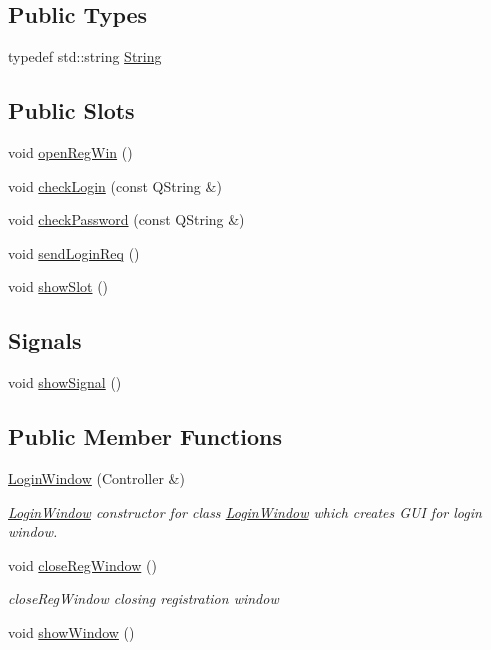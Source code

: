 \subsection*{Public Types}
\begin{DoxyCompactItemize}
\item 
typedef std\+::string \hyperlink{classLoginWindow_a9d5191a38906ea9c5375c1029cfd9d4d}{String}
\end{DoxyCompactItemize}
\subsection*{Public Slots}
\begin{DoxyCompactItemize}
\item 
void \hyperlink{classLoginWindow_abe06ec97d678045c810e2ac6033ee9c0}{open\+Reg\+Win} ()
\item 
void \hyperlink{classLoginWindow_a01edb22f1bf6dfdf3bd0811f6c878330}{check\+Login} (const Q\+String \&)
\item 
void \hyperlink{classLoginWindow_ad5a16b9244af77d36f98a4f48d3d423d}{check\+Password} (const Q\+String \&)
\item 
void \hyperlink{classLoginWindow_ac6dc94a63017e4e500b7ec0cbd4cac33}{send\+Login\+Req} ()
\item 
void \hyperlink{classLoginWindow_a8e8dfb5d47f4771d469be1d764aa8509}{show\+Slot} ()
\end{DoxyCompactItemize}
\subsection*{Signals}
\begin{DoxyCompactItemize}
\item 
void \hyperlink{classLoginWindow_a27cf306a0fd680afd528c016f2df8926}{show\+Signal} ()
\end{DoxyCompactItemize}
\subsection*{Public Member Functions}
\begin{DoxyCompactItemize}
\item 
\hyperlink{classLoginWindow_ad3f4ec97bdb1fd55e3e6f6f25112f9d8}{Login\+Window} (Controller \&)
\begin{DoxyCompactList}\small\item\em \hyperlink{classLoginWindow}{Login\+Window} constructor for class \hyperlink{classLoginWindow}{Login\+Window} which creates G\+UI for login window. \end{DoxyCompactList}\item 
void \hyperlink{classLoginWindow_a1d429ebfb0f2ebb21591b209da5d4ecb}{close\+Reg\+Window} ()
\begin{DoxyCompactList}\small\item\em close\+Reg\+Window closing registration window \end{DoxyCompactList}\item 
void \hyperlink{classLoginWindow_aea3395f2cf27b324b226af426f84514f}{show\+Window} ()
\end{DoxyCompactItemize}


